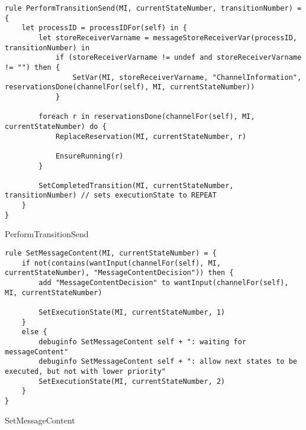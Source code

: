 \begin{listing}[H]
\begin{verbatim}
rule PerformTransitionSend(MI, currentStateNumber, transitionNumber) = {
    let processID = processIDFor(self) in {
        let storeReceiverVarname = messageStoreReceiverVar(processID, transitionNumber) in
            if (storeReceiverVarname != undef and storeReceiverVarname != "") then {
                SetVar(MI, storeReceiverVarname, "ChannelInformation", reservationsDone(channelFor(self), MI, currentStateNumber))
            }

        foreach r in reservationsDone(channelFor(self), MI, currentStateNumber) do {
            ReplaceReservation(MI, currentStateNumber, r)

            EnsureRunning(r)
        }

        SetCompletedTransition(MI, currentStateNumber, transitionNumber) // sets executionState to REPEAT
    }
}
\end{verbatim}
\caption{PerformTransitionSend}
\label{lst:asm:PerformTransitionSend}
\end{listing}




\begin{listing}[H]
\begin{verbatim}
rule SetMessageContent(MI, currentStateNumber) = {
    if not(contains(wantInput(channelFor(self), MI, currentStateNumber), "MessageContentDecision")) then {
        add "MessageContentDecision" to wantInput(channelFor(self), MI, currentStateNumber)

        SetExecutionState(MI, currentStateNumber, 1)
    }
    else {
        debuginfo SetMessageContent self + ": waiting for messageContent"
        debuginfo SetMessageContent self + ": allow next states to be executed, but not with lower priority"
        SetExecutionState(MI, currentStateNumber, 2)
    }
}
\end{verbatim}
\caption{SetMessageContent}
\label{lst:asm:SetMessageContent}
\end{listing}




